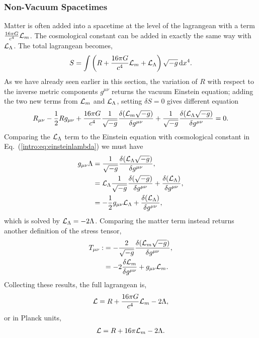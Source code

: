 \subsubsection*{Non-Vacuum Spacetimes}
Matter is often added into a spacetime at the level of the lagrangean with a term $\frac{16 \pi G}{c^4}\mathcal{L}_m$. The cosmological constant can be added in exactly the same way with $\mathcal{L}_\Lambda$. The total lagrangean becomes,
\begin{equation}
S = \int \left({R} + \frac{16 \pi G}{c^4} \mathcal{L}_m + \mathcal{L}_\Lambda \right)\sqrt{-g} \,\dd x^4.
\end{equation}
As we have already seen earlier in this section, the variation of $R$ with respect to the inverse metric components $g^{\mu\nu}$ returns the vacuum Einstein equation; adding the two new terms from $\mathcal{L}_m$ and $\mathcal{L}_\Lambda$, setting $\delta S =0$ gives different equation
\begin{equation}
R_{\mu\nu} - \frac{1}{2}Rg_{\mu\nu} + \frac{16 \pi G}{c^4}\frac{1}{\sqrt{-g}}\frac{\delta( \mathcal{L}_m \sqrt{-g})}{\delta g^{\mu\nu}} + \frac{1}{\sqrt{-g}}\frac{\delta (\mathcal{L}_\Lambda \sqrt{-g})}{\delta g^{\mu\nu}} = 0.
\end{equation}
Comparing the $\mathcal{L}_\Lambda$ term to the Einstein equation with cosmological constant in Eq.~(\ref{intro:eq:einsteinlambda}) we must have
\begin{align}
g_{\mu\nu} \Lambda &= \frac{1}{\sqrt{-g}}\frac{\delta (\mathcal{L}_\Lambda \sqrt{-g})}{\delta g^{\mu\nu}} , \\
&= \mathcal{L}_\Lambda \frac{1}{\sqrt{-g}}\frac{\delta ( \sqrt{-g})}{\delta g^{\mu\nu}} + \frac{\delta (\mathcal{L}_\Lambda )}{\delta g^{\mu\nu}}, \\
&=-\frac{1}{2}g_{\mu\nu}\mathcal{L}_\Lambda  + \frac{\delta (\mathcal{L}_\Lambda )}{\delta g^{\mu\nu}}, \\
\end{align}
which is solved by $\mathcal{L}_\Lambda = -2\Lambda$. Comparing the matter term instead returns another definition of the stress tensor,
\begin{align}
T_{\mu\nu}:&=-\frac{2}{\sqrt{-g}}\frac{\delta (\mathcal{L}_m \sqrt{-g})}{\delta g^{\mu\nu}},\\
&= -2\frac{\delta \mathcal{L}_m}{\delta g^{\mu\nu}} + g_{\mu\nu} \mathcal{L}_m .\label{intro:eq:Tdef}
\end{align} 
Collecting these results, the full lagrangean is,
\begin{align}
\mathcal{L} = R + \frac{16 \pi G}{c^4} \mathcal{L}_m -2\Lambda,
\end{align}
or in Planck units,
\begin{align}
\mathcal{L} = R + 16 \pi \mathcal{L}_m -2\Lambda.
\end{align}
